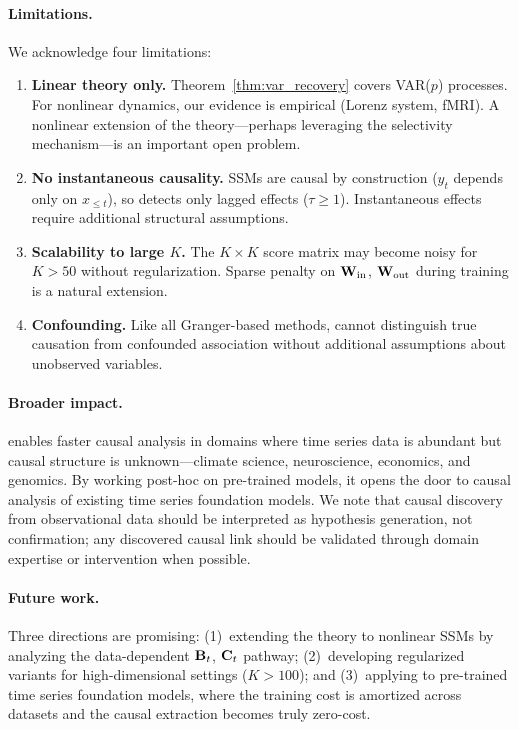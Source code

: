 \paragraph{Limitations.}
We acknowledge four limitations:
\begin{enumerate}[leftmargin=1.5em, topsep=0pt, itemsep=0pt]
    \item \textbf{Linear theory only.} Theorem~\ref{thm:var_recovery}
    covers VAR($p$) processes. For nonlinear dynamics, our evidence is
    empirical (Lorenz system, fMRI). A nonlinear extension of the
    theory---perhaps leveraging the selectivity mechanism---is an
    important open problem.
    \item \textbf{No instantaneous causality.} SSMs are causal by
    construction ($y_t$ depends only on $x_{\leq t}$), so \methodname{}
    detects only lagged effects ($\tau \geq 1$). Instantaneous effects
    require additional structural assumptions.
    \item \textbf{Scalability to large $K$.} The $K \times K$ score
    matrix may become noisy for $K > 50$ without regularization.
    Sparse penalty on $\mathbf{W}_{\text{in}}$, $\mathbf{W}_{\text{out}}$ during
    training is a natural extension.
    \item \textbf{Confounding.} Like all Granger-based methods,
    \methodname{} cannot distinguish true causation from confounded
    association without additional assumptions about unobserved
    variables.
\end{enumerate}

\paragraph{Broader impact.}
\methodname{} enables faster causal analysis in domains where time series
data is abundant but causal structure is unknown---climate science,
neuroscience, economics, and genomics. By working post-hoc on pre-trained
models, it opens the door to causal analysis of existing time series
foundation models. We note that causal discovery from observational data
should be interpreted as hypothesis generation, not confirmation; any
discovered causal link should be validated through domain expertise or
intervention when possible.

\paragraph{Future work.}
Three directions are promising: (1)~extending the theory to nonlinear
SSMs by analyzing the data-dependent $\mathbf{B}_t$, $\mathbf{C}_t$ pathway;
(2)~developing regularized variants for high-dimensional settings
($K > 100$); and (3)~applying \methodname{} to pre-trained time series
foundation models, where the training cost is amortized across datasets
and the causal extraction becomes truly zero-cost.
